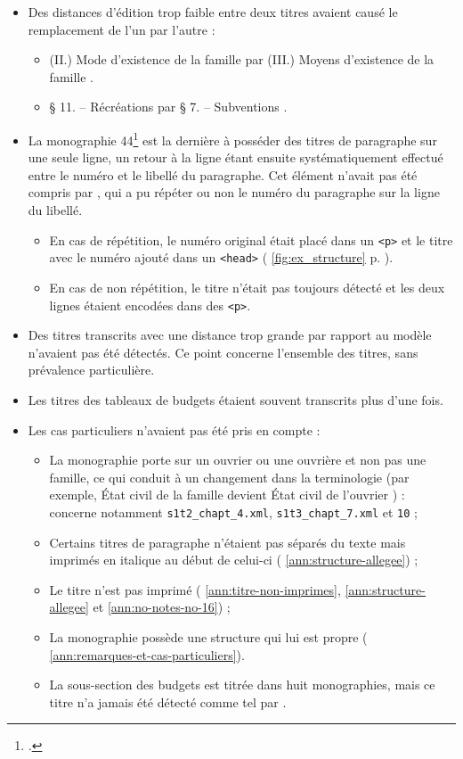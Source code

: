 \begin{itemize}
    \item Des distances d'édition trop faible entre deux titres avaient causé le remplacement de l'un par l'autre :
    \begin{itemize}
        \item (II.) \og Mode d'existence de la famille \fg{} par (III.) \og Moyens d'existence de la famille \fg.
        \item \og § 11. -- Récréations \fg{} par \og § 7. -- Subventions \fg.
    \end{itemize}
    \item La monographie \no{} 44\footcite{mono044a} est la dernière à posséder des titres de paragraphe sur une seule ligne, un retour à la ligne étant ensuite systématiquement effectué entre le numéro et le libellé du paragraphe. Cet élément n'avait pas été compris par \lse, qui a pu répéter ou non le numéro du paragraphe sur la ligne du libellé.
    \begin{itemize}
        \item En cas de répétition, le numéro original était placé dans un \texttt{<p>} et le titre avec le numéro ajouté dans un \texttt{<head>} (\fig{} \ref{fig:ex_structure} p. \pageref{fig:ex_structure}).
        \item En cas de non répétition, le titre n'était pas toujours détecté et les deux lignes étaient encodées dans des \texttt{<p>}.
    \end{itemize}
    \item Des titres transcrits avec une distance trop grande par rapport au modèle n'avaient pas été détectés. Ce point concerne l'ensemble des titres, sans prévalence particulière.
    \item Les titres des tableaux de budgets étaient souvent transcrits plus d'une fois.
    \item Les cas particuliers n'avaient pas été pris en compte :
    \begin{itemize}
        \item La monographie porte sur un ouvrier ou une ouvrière et non pas une famille, ce qui conduit à un changement dans la terminologie (par exemple, \og État civil de la famille \fg{} devient \og État civil de l'ouvrier \fg) : concerne notamment \texttt{s1t2\_chapt\_4.xml}, \texttt{s1t3\_chapt\_7.xml} et \texttt{10} ;
        \item Certains titres de paragraphe n'étaient pas séparés du texte mais imprimés en italique au début de celui-ci (\ann{} \ref{ann:structure-allegee}) ;
        \item Le titre n'est pas imprimé (\ann{} \ref{ann:titre-non-imprimes}, \ref{ann:structure-allegee} et \ref{ann:no-notes-no-16}) ;
        \item La monographie possède une structure qui lui est propre (\ann{} \ref{ann:remarques-et-cas-particuliers}).
        \item La sous-section des budgets est titrée dans huit monographies, mais ce titre n'a jamais été détecté comme tel par \lse.
    \end{itemize}
\end{itemize}

